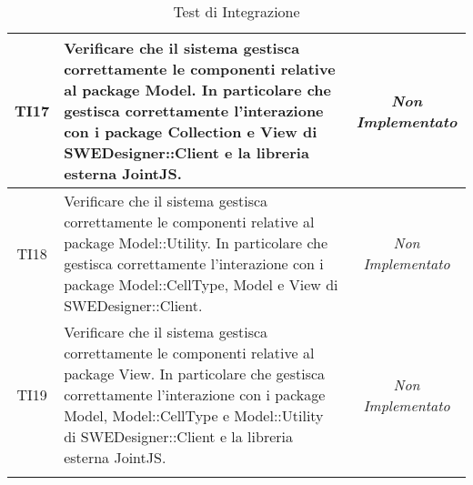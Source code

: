 \begin{longtable}{|c|>{}m{8cm}|c|}
\hypertarget{TI17}{TI17} & Verificare che il sistema gestisca correttamente le componenti relative al package Model. In particolare che gestisca correttamente l'interazione con i package Collection e View di SWEDesigner::Client e la libreria esterna JointJS. & \textit{Non Implementato}\\ \hline
\hypertarget{TI18}{TI18} & Verificare che il sistema gestisca correttamente le componenti relative al package Model::Utility. In particolare che gestisca correttamente l'interazione con i package Model::CellType, Model e View di SWEDesigner::Client. & \textit{Non Implementato}\\ \hline
\hypertarget{TI19}{TI19} & Verificare che il sistema gestisca correttamente le componenti relative al package View. In particolare che gestisca correttamente l'interazione con i package Model, Model::CellType e Model::Utility di SWEDesigner::Client e la libreria esterna JointJS. & \textit{Non Implementato}\\ \hline
\caption[Test di Integrazione]{Test di Integrazione}
\label{tabella:test2}
\end{longtable}

